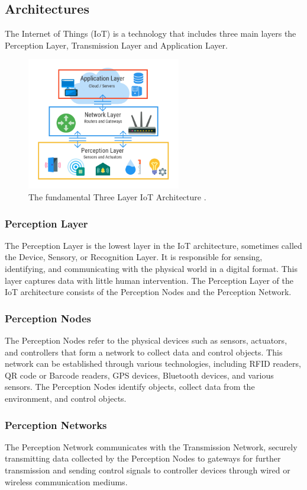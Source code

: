\documentclass[12pt]{report}
\begin{document}
	\subsection{Architectures}
	The Internet of Things (IoT) is a technology that includes three main layers the Perception Layer, Transmission Layer and Application Layer.\cite{gupta2020overview}
		\begin{figure}[H]
		\centering
		\includegraphics[width=0.6\textwidth]{three-layer-iot-architecture}
		\caption{The fundamental Three Layer IoT Architecture
			\cite{netburner}.}
		\label{fig:3layers}
	\end{figure}
	\subsubsection{Perception Layer}
	
The Perception Layer is the lowest layer in the IoT architecture, sometimes called the Device, Sensory, or Recognition Layer. It is responsible for sensing, identifying, and communicating with the physical world in a digital format. This layer captures data with little human intervention.
The Perception Layer of the IoT architecture consists of the Perception Nodes and the Perception Network.
	\subsubsection*{Perception Nodes}
	The Perception Nodes refer to the physical devices such as sensors, actuators, and controllers that form a network to collect data and control objects. This network can be established through various technologies, including RFID readers, QR code or Barcode readers, GPS devices, Bluetooth devices, and various sensors. The Perception Nodes identify objects, collect data from the environment, and control objects. 
	\subsubsection*{Perception Networks}
The Perception Network communicates with the Transmission Network, securely transmitting data collected by the Perception Nodes to gateways for further transmission and sending control signals to controller devices through wired or wireless communication mediums.
\end{document}
